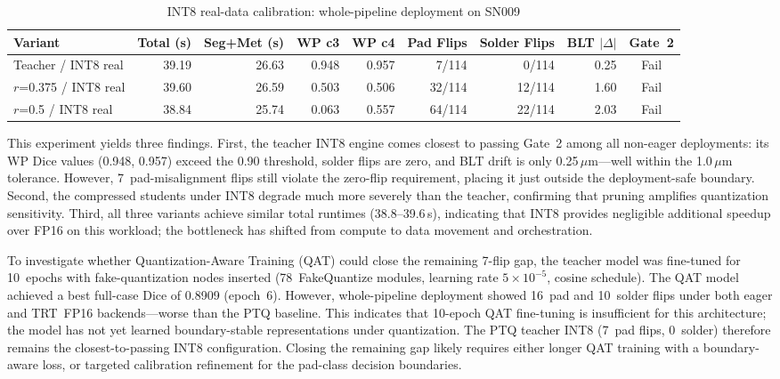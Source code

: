 \begin{table}[H]
\centering
\caption{INT8 real-data calibration: whole-pipeline deployment on SN009}
\label{tab:int8-deploy}
\begin{adjustbox}{max width=\textwidth}
\renewcommand{\arraystretch}{1.15}
\begin{tabular}{l | rr | rr | rr | r | c}
\toprule
\textbf{Variant} & \textbf{Total (s)} & \textbf{Seg+Met (s)} & \textbf{WP c3} & \textbf{WP c4} & \textbf{Pad Flips} & \textbf{Solder Flips} & \textbf{BLT $|\Delta|$} & \textbf{Gate~2} \\
\midrule
Teacher / INT8 real      & 39.19 & 26.63 & 0.948 & 0.957 & 7/114  & 0/114  & 0.25 & Fail \\
$r$=0.375 / INT8 real    & 39.60 & 26.59 & 0.503 & 0.506 & 32/114 & 12/114 & 1.60 & Fail \\
$r$=0.5 / INT8 real      & 38.84 & 25.74 & 0.063 & 0.557 & 64/114 & 22/114 & 2.03 & Fail \\
\bottomrule
\end{tabular}
\end{adjustbox}
\end{table}

This experiment yields three findings. First, the teacher INT8 engine comes closest to passing Gate~2 among all non-eager deployments: its WP Dice values (0.948, 0.957) exceed the 0.90 threshold, solder flips are zero, and BLT drift is only 0.25\,$\mu$m---well within the 1.0\,$\mu$m tolerance. However, 7~pad-misalignment flips still violate the zero-flip requirement, placing it just outside the deployment-safe boundary. Second, the compressed students under INT8 degrade much more severely than the teacher, confirming that pruning amplifies quantization sensitivity. Third, all three variants achieve similar total runtimes (38.8--39.6\,s), indicating that INT8 provides negligible additional speedup over FP16 on this workload; the bottleneck has shifted from compute to data movement and orchestration.

To investigate whether Quantization-Aware Training (QAT) could close the remaining 7-flip gap, the teacher model was fine-tuned for 10~epochs with fake-quantization nodes inserted (78~FakeQuantize modules, learning rate $5 \times 10^{-5}$, cosine schedule). The QAT model achieved a best full-case Dice of 0.8909 (epoch~6). However, whole-pipeline deployment showed 16~pad and 10~solder flips under both eager and TRT~FP16 backends---worse than the PTQ baseline. This indicates that 10-epoch QAT fine-tuning is insufficient for this architecture; the model has not yet learned boundary-stable representations under quantization. The PTQ teacher INT8 (7~pad flips, 0~solder) therefore remains the closest-to-passing INT8 configuration. Closing the remaining gap likely requires either longer QAT training with a boundary-aware loss, or targeted calibration refinement for the pad-class decision boundaries.

